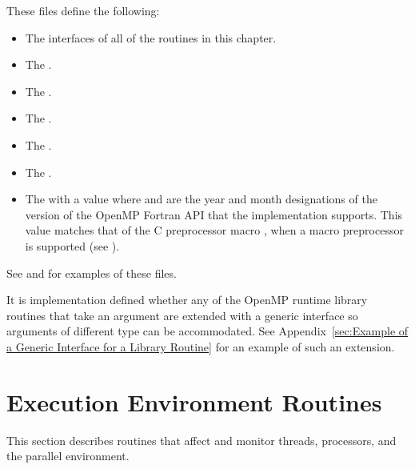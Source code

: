 These files define the following:

\begin{itemize}
\item The interfaces of all of the routines in this chapter.

\item The   .

\item The   .

\item The   .

\item The   .

\item The   .

\item The    with a value  where  
and  are the year and month designations of the version of the OpenMP Fortran 
API that the implementation supports. This value matches that of the C preprocessor 
macro , when a macro preprocessor is supported (see 
).
\end{itemize}

See  
and  
for examples of these files.

It is implementation defined whether any of the OpenMP runtime library routines that 
take an argument are extended with a generic interface so arguments of different  
type can be accommodated. See Appendix~\ref{sec:Example of a Generic Interface for a Library Routine}
for an example of such an extension. 
\fortranspecificend









\section{Execution Environment Routines}
\label{sec:Execution Environment Routines}
This section describes routines that affect and monitor threads, processors, and the 
parallel environment. 






